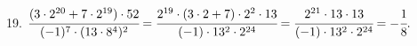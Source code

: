 19. $\cfrac{(3\cdot 2^{20}+7\cdot 2^{19})\cdot 52}{(-1)^7\cdot(13\cdot8^4)^2}=\cfrac{2^{19}\cdot(3\cdot2+7)\cdot 2^2\cdot13}{(-1)\cdot13^2\cdot2^{24}}=
\cfrac{2^{21}\cdot13\cdot13}{(-1)\cdot13^2\cdot2^{24}}=-\cfrac{1}{8}.$\\
